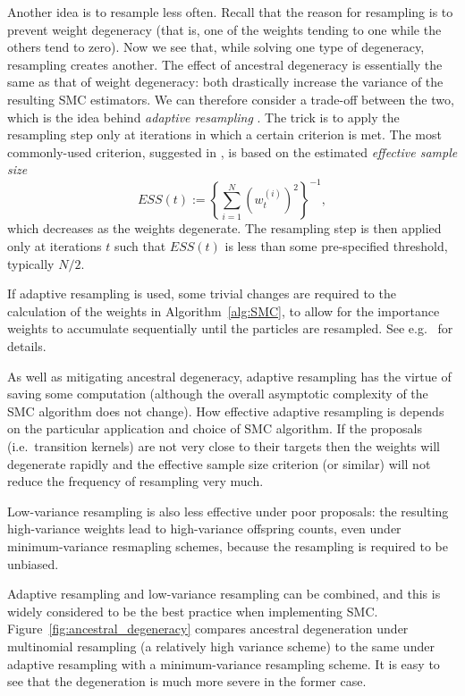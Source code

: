 Another idea is to resample less often. Recall that the reason for resampling is to prevent weight degeneracy (that is, one of the weights tending to one while the others tend to zero). Now we see that, while solving one type of degeneracy, resampling creates another. The effect of ancestral degeneracy is essentially the same as that of weight degeneracy: both drastically increase the variance of the resulting SMC estimators. 
We can therefore consider a trade-off between the two, which is the idea behind \emph{adaptive resampling} \parencite[Section 4]{liu1995}.
The trick is to apply the resampling step only at iterations in which a certain criterion is met. The most commonly-used criterion, suggested in \textcite[Equation (14)]{liu1995}, is based on the estimated \emph{effective sample size}
\begin{equation*}
ESS(t) := \left\{ \sum_{i=1}^N (w_t^{(i)})^2 \right\}^{-1} ,
\end{equation*}
which decreases as the weights degenerate.
The resampling step is then applied only at iterations $t$ such that $ESS(t)$ is less than some pre-specified threshold, typically $N/2$\seb{[citation?]}.

If adaptive resampling is used, some trivial changes are required to the calculation of the weights in Algorithm~\ref{alg:SMC}, to allow for the importance weights to accumulate sequentially until the particles are resampled. See e.g.\ \textcite[Section 10.2]{chopin2020} for details.

As well as mitigating ancestral degeneracy, adaptive resampling has the virtue of saving some computation (although the overall asymptotic complexity of the SMC algorithm does not change).
How effective adaptive resampling is depends on the particular application and choice of SMC algorithm. If the proposals (i.e.\ transition kernels) are not very close to their targets then the weights will degenerate rapidly and the effective sample size criterion (or similar) will not reduce the frequency of resampling very much.

Low-variance resampling is also less effective under poor proposals: the resulting high-variance weights lead to high-variance offspring counts, even under minimum-variance resmapling schemes, because the resampling is required to be unbiased.

Adaptive resampling and low-variance resampling can be combined, and this is widely considered to be the best practice when implementing SMC.
Figure~\ref{fig:ancestral_degeneracy} compares ancestral degeneration under multinomial resampling (a relatively high variance scheme) to the same under adaptive resampling with a minimum-variance resampling scheme.
It is easy to see that the degeneration is much more severe in the former case.

